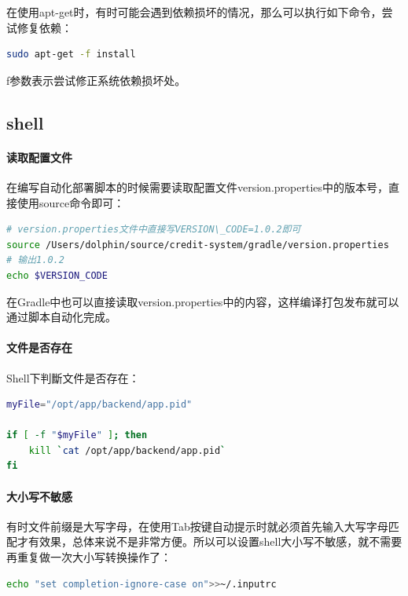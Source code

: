 \documentclass[letter]{book}
\begin{document}
在使用apt-get时，有时可能会遇到依赖损坏的情况，那么可以执行如下命令，尝试修复依赖：

\begin{lstlisting}[language=Bash]
sudo apt-get -f install 
\end{lstlisting}

f参数表示尝试修正系统依赖损坏处。

\subsection{shell}

\paragraph{读取配置文件}在编写自动化部署脚本的时候需要读取配置文件version.properties中的版本号，直接使用source命令即可：

\begin{lstlisting}[language=Bash]
# version.properties文件中直接写VERSION\_CODE=1.0.2即可
source /Users/dolphin/source/credit-system/gradle/version.properties
# 输出1.0.2
echo $VERSION_CODE
\end{lstlisting}

在Gradle中也可以直接读取version.properties中的内容，这样编译打包发布就可以通过脚本自动化完成。

\paragraph{文件是否存在}

Shell下判斷文件是否存在：

\begin{lstlisting}[language=Bash]
myFile="/opt/app/backend/app.pid"

if [ -f "$myFile" ]; then
	kill `cat /opt/app/backend/app.pid`
fi
\end{lstlisting}

\paragraph{大小写不敏感}

有时文件前缀是大写字母，在使用Tab按键自动提示时就必须首先输入大写字母匹配才有效果，总体来说不是非常方便。所以可以设置shell大小写不敏感，就不需要再重复做一次大小写转换操作了：

\begin{lstlisting}[language=Bash]
echo "set completion-ignore-case on">>~/.inputrc
\end{lstlisting}
\end{document}
